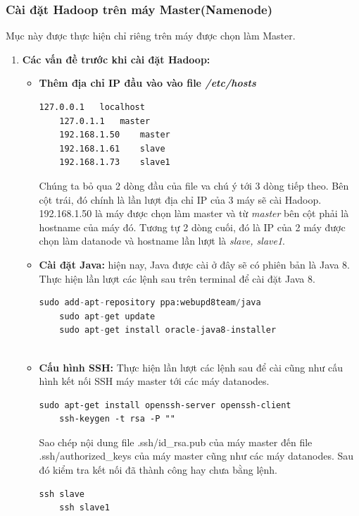 	\subsubsection{Cài đặt Hadoop trên máy Master(Namenode)}
	Mục này được thực hiện chỉ riêng trên máy được chọn làm Master.
		\begin{enumerate}
			\item \textbf{Các vấn đề trước khi cài đặt Hadoop:}
			\begin{itemize}
			
				\item \textbf{Thêm địa chỉ IP đầu vào vào file \textit{/etc/hosts}}				
				\begin{lstlisting}[caption=Nội dung file /etc/hosts]
	127.0.0.1	localhost
	127.0.1.1	master
	192.168.1.50	master
	192.168.1.61	slave
	192.168.1.73	slave1

				\end{lstlisting}
				Chúng ta bỏ qua 2 dòng đầu của file va chú ý tới 3 dòng tiếp theo. Bên cột trái, đó chính là lần lượt địa chỉ IP của 3 máy sẽ cài Hadoop. 192.168.1.50 là máy được chọn làm master và từ \textit{master} bên cột phải là hostname của máy đó. Tương tự 2 dòng cuối, đó là IP của 2 máy được chọn làm datanode và hostname lần lượt là \textit{slave, slave1}.\par 
				\item \textbf{Cài đặt Java:} hiện nay, Java được cài ở đây sẽ có phiên bản là Java 8. Thực hiện lần lượt các lệnh sau trên terminal để cài đặt Java 8.
				
				\begin{lstlisting}[language=python,caption=Cài đặt Java 8]
	sudo add-apt-repository ppa:webupd8team/java	
	sudo apt-get update	
	sudo apt-get install oracle-java8-installer
	
				\end{lstlisting}
				
				\item \textbf{Cấu hình SSH: } Thực hiện lần lượt các lệnh sau để cài cũng như cấu hình kết nối SSH máy master tới các máy datanodes.
				\pagebreak
				\begin{lstlisting}[caption=Cài đặt SSH]
	sudo apt-get install openssh-server openssh-client	
	ssh-keygen -t rsa -P ""	
				\end{lstlisting}
				Sao chép nội dung file .ssh/id\_rsa.pub của máy master đến file .ssh/authorized\_keys của máy master cũng như các máy datanodes. Sau đó kiểm tra kết nối đã thành công hay chưa bằng lệnh.\par
				\begin{lstlisting}[caption=Kết nối SSH]
	ssh slave
	ssh slave1
				\end{lstlisting}
				

\end{itemize}
\end{enumerate}
